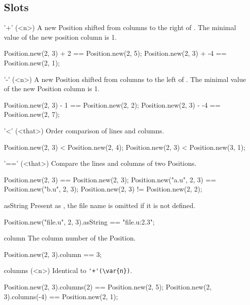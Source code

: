 \subsection{Slots}

\begin{urbiscriptapi}
\item['+'](<n>)%
  A new Position shifted from  columns to the right of \this.  The
  minimal value of the new position column is 1.
\begin{urbiassert}
Position.new(2, 3) + 2  == Position.new(2, 5);
Position.new(2, 3) + -4 == Position.new(2, 1);
\end{urbiassert}


\item['-'](<n>)%
  A new Position shifted from  columns to the left of \this.  The
  minimal value of the new Position column is 1.
\begin{urbiassert}
Position.new(2, 3) - 1  == Position.new(2, 2);
Position.new(2, 3) - -4 == Position.new(2, 7);
\end{urbiassert}


\item['<'](<that>)%
  Order comparison of lines and columns.
\begin{urbiassert}
Position.new(2, 3) < Position.new(2, 4);
Position.new(2, 3) < Position.new(3, 1);
\end{urbiassert}


\item['=='](<that>)%
  Compare the lines and columns of two Positions.
\begin{urbiassert}
Position.new(2, 3)        == Position.new(2, 3);
Position.new("a.u", 2, 3) == Position.new("b.u", 2, 3);
Position.new(2, 3)        != Position.new(2, 2);
\end{urbiassert}


\item[asString]
  Present as , the file name is
  omitted if it is not defined.
\begin{urbiassert}
Position.new("file.u", 2, 3).asString == "file.u:2.3";
\end{urbiassert}


\item[column]
  The column number of the Position.
\begin{urbiassert}
Position.new(2, 3).column == 3;
\end{urbiassert}


\item[columns](<n>)%
  Identical to \lstinline|'+'(\var{n})|.
\begin{urbiassert}
Position.new(2, 3).columns(2)  == Position.new(2, 5);
Position.new(2, 3).columns(-4) == Position.new(2, 1);
\end{urbiassert}



\end{urbiscriptapi}
